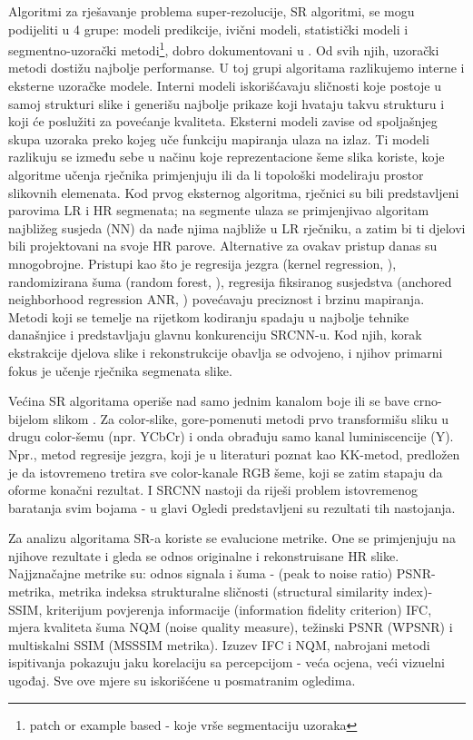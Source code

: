 \documentclass[12pt]{report}
\numberwithin{equation}{section}
\begin{document}
Algoritmi za rješavanje problema super-rezolucije, SR algoritmi, \cite{alg} se mogu podijeliti u 4 grupe: modeli predikcije, ivični modeli, statistički modeli i segmentno-uzorački metodi\footnote{patch or example based - koje vrše segmentaciju uzoraka}, dobro dokumentovani u \cite{alg2}. Od svih njih, uzorački metodi dostižu najbolje performanse. U toj grupi algoritama razlikujemo interne i eksterne uzoračke modele. Interni modeli iskorišćavaju sličnosti koje postoje u samoj strukturi slike i generišu najbolje prikaze koji hvataju takvu strukturu i koji će poslužiti za povećanje kvaliteta. Eksterni modeli zavise od spoljašnjeg skupa uzoraka preko kojeg uče funkciju mapiranja ulaza na izlaz. Ti modeli razlikuju se između sebe u načinu koje reprezentacione šeme slika koriste, koje algoritme učenja rječnika primjenjuju ili da li topološki modeliraju prostor slikovnih elemenata. Kod prvog eksternog algoritma, rječnici su bili predstavljeni parovima LR i HR segmenata; na segmente ulaza se primjenjivao algoritam najbližeg susjeda (NN) da nađe njima najbliže u LR rječniku, a zatim bi ti djelovi bili projektovani na svoje HR parove. Alternative za ovakav pristup danas su mnogobrojne. Pristupi kao što je regresija jezgra (kernel regression, \cite{kernel}), randomizirana šuma (random forest, \cite{forest}), regresija fiksiranog susjedstva (anchored neighborhood regression ANR, \cite{anr}) povećavaju preciznost i brzinu mapiranja. Metodi koji se temelje na rijetkom kodiranju spadaju u najbolje tehnike današnjice i predstavljaju glavnu konkurenciju SRCNN-u. Kod njih, korak ekstrakcije djelova slike i rekonstrukcije obavlja se odvojeno, i njihov primarni fokus je učenje rječnika segmenata slike.   


Većina SR algoritama operiše nad samo jednim kanalom boje ili se bave crno-bijelom slikom . Za color-slike, gore-pomenuti metodi prvo transformišu sliku u drugu color-šemu (npr. YCbCr) i onda obrađuju samo kanal luminiscencije (Y).  Npr., metod regresije jezgra, koji je u literaturi poznat kao KK-metod, predložen je da istovremeno tretira sve color-kanale RGB šeme, koji se zatim stapaju da oforme konačni rezultat. I SRCNN nastoji da riješi problem istovremenog baratanja svim bojama - u glavi Ogledi predstavljeni su rezultati tih nastojanja.

Za analizu algoritama SR-a koriste se evalucione metrike. One se primjenjuju na njihove rezultate i gleda se odnos originalne i rekonstruisane HR slike. Najjznačajne metrike \cite{alg2} su: odnos signala i šuma - (peak to noise ratio) PSNR-metrika, metrika indeksa strukturalne sličnosti (structural similarity index)- SSIM, kriterijum povjerenja informacije (information fidelity criterion) IFC, mjera kvaliteta šuma NQM (noise quality measure), težinski PSNR (WPSNR) i multiskalni SSIM (MSSSIM metrika). Izuzev IFC i NQM, nabrojani metodi ispitivanja pokazuju jaku korelaciju sa percepcijom - veća ocjena, veći vizuelni ugođaj. Sve ove mjere su iskorišćene u posmatranim ogledima.    
\end{document}
